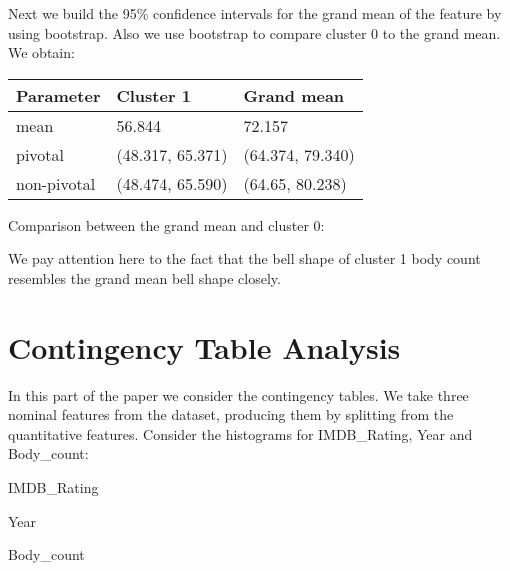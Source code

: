 \documentclass[a4paper,14pt]{article}
\begin{document}
\normalsize


Next we build the 95\% confidence intervals for the grand mean of the feature by using bootstrap. Also we use bootstrap to compare cluster 0 to the grand mean.  We obtain:


\begin{center}
	\begin{tabular}{|l|l|l|}
		\hline
		\textbf{Parameter} & \textbf{Cluster 1}  & \textbf{Grand mean}  \\ \hline
		mean & 56.844 & 72.157 \\ \hline
		pivotal & (48.317, 65.371) & (64.374, 79.340)  \\ \hline
		non-pivotal & (48.474, 65.590)  & (64.65, 80.238)  \\ \hline
	\end{tabular}
\end{center}

\normalsize

Comparison between the grand mean and cluster 0:
    \begin{center}
\end{center}
We pay attention here to the fact that the bell shape of cluster 1 body count resembles the grand mean bell shape closely.
    \begin{center}
\end{center}


    \section{Contingency Table Analysis}
    
In this part of the paper we consider the contingency tables. We take three nominal features from the dataset, producing them by splitting from the quantitative features. Consider the histograms for IMDB\_Rating, Year and Body\_count:

\newpage
\begin{multicols}{2}
    \begin{center}
	IMDB\_Rating
\end{center}
\begin{center}
	Year
\end{center}
    \begin{center}
	 Body\_count
\end{center}

\end{multicols}
\end{document}
